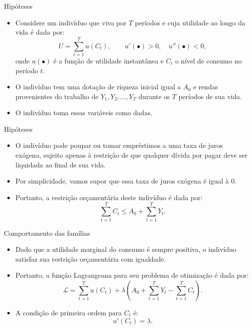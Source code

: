 \documentclass[10pt]{beamer}
\begin{document}
\begin{frame}{Hipóteses}
    \begin{itemize}
        \item Considere um indivíduo que viva por $T$ períodos e cuja utilidade ao longo da vida é dada por:
        \begin{equation}
            U = \sum_{t=1}^T u(C_t), \qquad u'(\bullet)>0, \quad u''(\bullet)<0,
            \label{eq2}
        \end{equation}
        onde $u(\bullet)$ é a função de utilidade instantânea e $C_t$ o nível de consumo no período $t$.
        \bigskip
        \item O indivíduo tem uma dotação de riqueza inicial igual a $A_0$ e rendas provenientes do trabalho de $Y_1, Y_2, \dots, Y_T$ durante os $T$ períodos de sua vida.
        \bigskip
        \item O indivíduo toma essas variáveis como dadas.
    \end{itemize}
\end{frame}

\begin{frame}{Hipóteses}
    \begin{itemize}
        \item O indivíduo pode poupar ou tomar empréstimos a uma taxa de juros exógena, sujeito apenas à restrição de que qualquer dívida por pagar deve ser liquidada ao final de sua vida.
        \bigskip
        \item Por simplicidade, vamos supor que essa taxa de juros exógena é igual à 0.
        \bigskip
        \item Portanto, a restrição orçamentária deste indivíduo é dada por:
        \begin{equation}
            \sum_{t=1}^T C_t \leq A_0 + \sum_{t=1}^T Y_t.
            \label{eq3}
        \end{equation}
    \end{itemize}
\end{frame}

\begin{frame}{Comportamento das famílias}
    \begin{itemize}
        \item Dado que a utilidade marginal do consumo é sempre positiva, o indivíduo satisfaz sua restrição orçamentária com igualdade.
        \bigskip
        \item Portanto, a função Lagrangeana para seu problema de otimização é dada por:
        \begin{equation}
            \mathcal{L} = \sum_{t=1}^T u(C_t) + \lambda\left(A_0 + \sum_{t=1}^T Y_t - \sum_{t=1}^T C_t\right).
            \label{eq4}
        \end{equation}
        \bigskip
        \item A condição de primeira ordem para $C_t$ é:
        \begin{equation}
            u'(C_t) = \lambda. \label{eq5}
        \end{equation}
    \end{itemize}
\end{frame}
\end{document}
